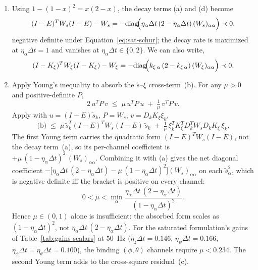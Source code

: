 \documentclass[conf]{new-aiaa}
\begin{document}
\begin{enumerate}
\item Using $1 - (1-x)^2 = x(2 - x)$, the decay terms (a) and (d) become
\small
\begin{equation}
(I-E)^T W_s (I-E) - W_s
= -\mathrm{diag}\!\Bigl( \eta_\alpha \Delta t\, (2 - \eta_\alpha \Delta t)\, (W_s)_{\alpha\alpha} \Bigr) \prec 0,
\end{equation}
\normalsize
negative definite under Equation~\ref{eq:sat-schur}; the decay rate is maximized at $\eta_\alpha \Delta t = 1$ and vanishes at $\eta_\alpha \Delta t \in \{0, 2\}$. We can also write,
\small
\begin{equation}
(I-K_\xi)^T W_\xi (I-K_\xi) - W_\xi = -\mathrm{diag}\!\Bigl( k_{\xi\,\alpha}\, (2 - k_{\xi\,\alpha})\, (W_\xi)_{\alpha\alpha} \Bigr) \prec 0.
\end{equation}
\normalsize

\item Apply Young’s inequality to absorb the $\tilde s$–$\xi$ cross-term~(b). For any $\mu > 0$ and positive-definite $P$,
\begin{equation}
\label{eq:sat-young-template}
2\, u^T P\, v \;\leq\; \mu\, u^T P\, u \;+\; \tfrac{1}{\mu}\, v^T P\, v.
\end{equation}
Apply with $u = (I-E) \tilde s_k$, $P = W_s$, $v = D_k K_\xi \xi_k$,
\small
\begin{equation}
\label{eq:sat-young}
\text{(b)} \;\leq\; \mu\, \tilde s_k^T (I-E)^T W_s (I-E)\, \tilde s_k
\;+\; \tfrac{1}{\mu}\, \xi_k^T K_\xi^T D_k^T W_s D_k K_\xi\, \xi_k.
\end{equation}
\normalsize
The first Young term carries the quadratic form $(I-E)^T W_s (I-E)$, not the decay term~(a), so its per-channel coefficient is $+\mu\,(1 - \eta_\alpha \Delta t)^2\, (W_s)_{\alpha\alpha}$. Combining it with (a) gives the net diagonal coefficient $-\bigl[\eta_\alpha \Delta t\,(2 - \eta_\alpha \Delta t) - \mu\,(1 - \eta_\alpha \Delta t)^2\bigr](W_s)_{\alpha\alpha}$ on each $\tilde s_\alpha^2$, which is negative definite iff the bracket is positive on every channel:
\begin{equation}
\label{eq:sat-mu-bound}
0 < \mu < \min_\alpha \frac{\eta_\alpha \Delta t\,(2 - \eta_\alpha \Delta t)}{(1 - \eta_\alpha \Delta t)^2}.
\end{equation}
Hence $\mu \in (0,1)$ alone is insufficient: the absorbed form scales as $(1-\eta_\alpha\Delta t)^2$, not $\eta_\alpha\Delta t\,(2-\eta_\alpha\Delta t)$. For the saturated formulation's gains of Table~\ref{tab:gains-scalars} at $50$~Hz ($\eta_z\Delta t = 0.146$, $\eta_\psi\Delta t = 0.166$, $\eta_\phi\Delta t = \eta_\theta\Delta t = 0.100$), the binding $(\phi,\theta)$ channels require $\mu < 0.234$. The second Young term adds to the cross-square residual~(c).


\end{enumerate}
\end{document}
